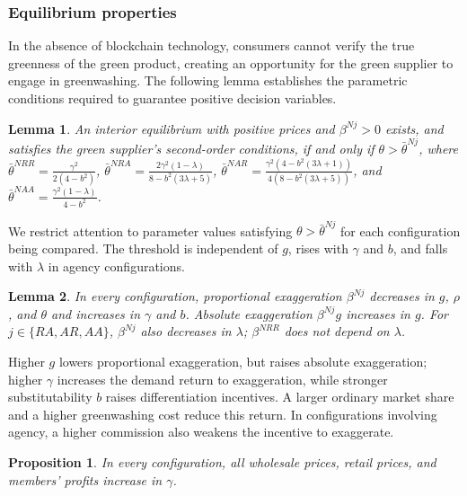 \documentclass[preprint,review,12pt,authoryear,nopreprintline]{elsarticle}
\newtheorem{lemma}{Lemma}
\newtheorem{proposition}{Proposition}
\theoremstyle{definition}
\begin{document}
\subsubsection{Equilibrium properties}

In the absence of blockchain technology, consumers cannot verify the true greenness of the green product, creating an opportunity for the green supplier to engage in greenwashing. The following lemma establishes the parametric conditions required to guarantee positive decision variables.

\begin{lemma}\label{lem:interior}
An interior equilibrium with positive prices and $\beta^{Nj}>0$ exists, and satisfies the green supplier's second-order conditions, if and only if $\theta>\bar{\theta}^{Nj}$, where $\bar{\theta}^{NRR}=\frac{\gamma ^2}{2(4-b^2)}$, $\bar{\theta}^{NRA}=\frac{2 \gamma ^2 (1-\lambda )}{8-b^2 (3 \lambda +5)}$, $\bar{\theta}^{NAR}=\frac{\gamma ^2 \left(4-b^2 (3 \lambda +1)\right)}{4 \left(8-b^2 (3 \lambda +5)\right)}$, and $\bar{\theta}^{NAA}=\frac{\gamma ^2 (1-\lambda )}{4-b^2}$.
\end{lemma}

We restrict attention to parameter values satisfying $\theta>\bar{\theta}^{Nj}$ for each configuration being compared. The threshold is independent of $g$, rises with $\gamma$ and $b$, and falls with $\lambda$ in agency configurations.

\begin{lemma}\label{lem:beta}
In every configuration, proportional exaggeration $\beta^{Nj}$ decreases in $g$, $\rho$, and $\theta$ and increases in $\gamma$ and $b$. Absolute exaggeration $\beta^{Nj}g$ increases in $g$. For $j\in\{RA,AR,AA\}$, $\beta^{Nj}$ also decreases in $\lambda$; $\beta^{NRR}$ does not depend on $\lambda$.
\end{lemma}

Higher $g$ lowers proportional exaggeration, but raises absolute exaggeration; higher $\gamma$ increases the demand return to exaggeration, while stronger substitutability $b$ raises differentiation incentives. A larger ordinary market share and a higher greenwashing cost reduce this return. In configurations involving agency, a higher commission also weakens the incentive to exaggerate.

\begin{proposition}\label{prop:trust}
In every configuration, all wholesale prices, retail prices, and members' profits increase in $\gamma$.
\end{proposition}
\end{document}
